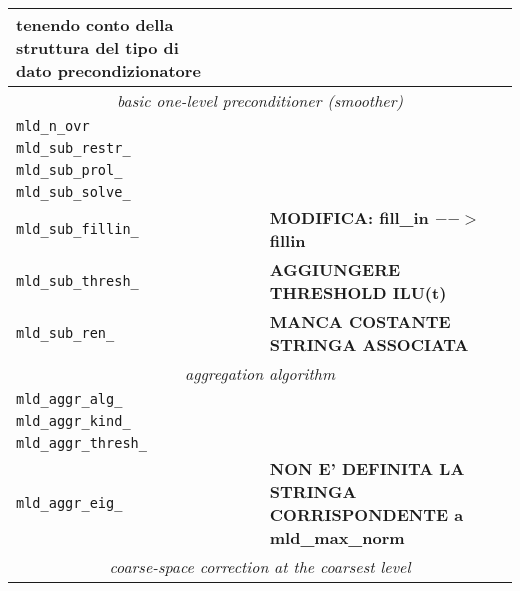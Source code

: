 \begin{table}[p]
{\begin{center}
\begin{tabular}{|l|l|p{1.5cm}|l|p{6cm}|}
{                           tenendo conto della struttura del tipo di dato precondizionatore}           \\ \hline
\multicolumn{5}{|c|}{\emph{basic one-level preconditioner (smoother)}}                                 \\ \hline
\verb|mld_n_ovr|         & 
                         & 
                         &
                         &     \\
\verb|mld_sub_restr_|    & 
                         & 
                         &
                         &     \\
\verb|mld_sub_prol_|     & 
                         & 
                         &
                         &     \\
\verb|mld_sub_solve_|    & 
                         & 
                         &
                         &     \\    
\verb|mld_sub_fillin_|   &
                         &
                         &
                         &     \textbf{MODIFICA: fill\_in $-->$ fillin} \\
\verb|mld_sub_thresh_|   &
                         &
                         &
                         &     \textbf{AGGIUNGERE THRESHOLD ILU(t)} \\
\verb|mld_sub_ren_|      &
                         &
                         &
                         &  \textbf{MANCA COSTANTE STRINGA ASSOCIATA}                                \\ \hline
\multicolumn{5}{|c|}{\emph{aggregation algorithm}}                                                   \\ \hline
\verb|mld_aggr_alg_|     &
                         &
                         &
                         &                                                                           \\
\verb|mld_aggr_kind_|    &
                         &
                         &
                         &     \\
\verb|mld_aggr_thresh_|  &
                         &
                         &
                         &     \\
\verb|mld_aggr_eig_|     &
                         &
                         &
                         & \textbf{NON E' DEFINITA LA STRINGA CORRISPONDENTE a mld\_max\_norm}           \\ \hline
\multicolumn{5}{|c|}{\emph{coarse-space correction at the coarsest level}}                               \\ \hline

\end{tabular}
\end{center}}
\end{table}
